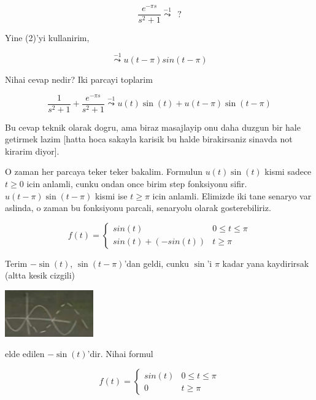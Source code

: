 \documentclass[12pt,fleqn]{article}\usepackage{../common}
\begin{document}
\[ \frac{e^{-\pi s}}{s^2 + 1} \stackrel{-1}{\leadsto} \ \ ? \]

Yine (2)'yi kullanirim, 

\[\stackrel{-1}{\leadsto} u(t-\pi)sin(t-\pi) \]

Nihai cevap nedir? Iki parcayi toplarim

\[ \frac{1}{s^2+1} + \frac{e^{-\pi s}}{s^2 + 1} \stackrel{-1}{\leadsto} 
u(t)\sin(t) + u(t-\pi)\sin(t-\pi) 
\]

Bu cevap teknik olarak dogru, ama biraz masajlayip onu daha duzgun bir hale
getirmek lazim [hatta hoca sakayla karisik bu halde birakirsaniz sinavda
not kirarim diyor]. 

O zaman her parcaya teker teker bakalim. Formulun $u(t)\sin(t)$ kismi
sadece $t \ge 0$ icin anlamli, cunku ondan once birim step fonksiyonu
sifir. $u(t-\pi)\sin(t-\pi) $ kismi ise $t \ge \pi$ icin anlamli. Elimizde
iki tane senaryo var aslinda, o zaman bu fonksiyonu parcali, senaryolu
olarak gosterebiliriz. 

\[ 
f(t) = 
\left\{ \begin{array}{ll}
sin(t) & 0 \le t \le \pi \\
sin(t) + (-sin(t)) & t \ge \pi
\end{array} \right.
 \]

Terim $-\sin(t)$, $\sin(t-\pi)$'dan geldi, cunku $\sin$'i $\pi$ kadar yana
kaydirirsak (altta kesik cizgili) 

\includegraphics[height=2cm]{22_10.png}

elde edilen $-\sin(t)$'dir. Nihai formul

\[ 
f(t) = 
\left\{ \begin{array}{ll}
sin(t) & 0 \le t \le \pi \\
0 & t \ge \pi
\end{array} \right.
 \]
\end{document}
